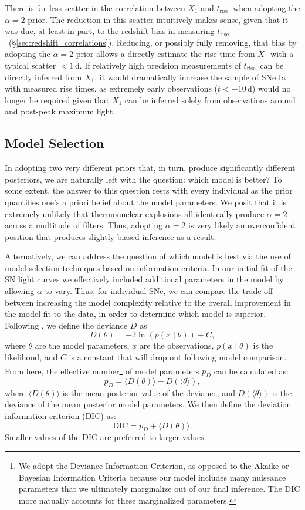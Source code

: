 \documentclass[twocolumn]{./aastex63}
\newcommand{\trise}{$t_\mathrm{rise}$}
\begin{document}
There is far less scatter in the correlation between $X_1$ and \trise\ when
adopting the $\alpha = 2$ prior. The reduction in this scatter intuitively
makes sense, given that it was due, at least in part, to the redshift bias in
measuring \trise\ (\S\ref{sec:redshift_correlations}). Reducing, or possibly
fully removing, that bias by adopting the $\alpha = 2$ prior allows a directly
estimate the rise time from $X_1$ with a typical scatter $< 1$\,d. If
relatively high precision measurements of \trise\ can be directly inferred
from $X_1$, it would dramatically increase the sample of SNe Ia with measured
rise times, as extremely early observations ($t < -10$\,d) would no longer be
required given that $X_1$ can be inferred solely from observations around and
post-peak maximum light.

\subsection{Model Selection}\label{sec:dic}

In adopting two very different priors that, in turn, produce significantly
different posteriors, we are naturally left with the question: which model is
better? To some extent, the answer to this question rests with every individual
as the prior quantifies one's a priori belief about the model parameters. We
posit that it is extremely unlikely that thermonuclear explosions all
identically produce $\alpha = 2$ across a multitude of filters. Thus, adopting
$\alpha = 2$ is very likely an overconfident position that produces slightly
biased inference as a result.

Alternatively, we can address the question of which model is best via the use
of model selection techniques based on information criteria. In our initial
fit of the SN light curves we effectively included additional parameters in
the model by allowing $\alpha$ to vary. Thus, for individual SNe, we can
compare the trade off between increasing the model complexity relative to the
overall improvement in the model fit to the data, in order to determine which
model is superior. Following \citet{Spiegelhalter02}, we define the deviance
$D$ as
%
$$D(\theta) = -2 \ln (p(x\mid \theta)) + C,$$
%
where $\theta$ are the model parameters, $x$ are the observations, $p(x\mid
\theta)$ is the likelihood, and $C$ is a constant that will drop out following
model comparison. From here, the effective number\footnote{We adopt the
Deviance Information Criterion, as opposed to the Akaike or Bayesian
Information Criteria because our model includes many nuissance parameters that
we ultimately marginalize out of our final inference. The DIC more natually
accounts for these marginalized parameters.} of model parameters $p_D$ can be
calculated as:
%
$$p_D = \langle D(\theta) \rangle - D(\langle \theta \rangle),$$
%
where $\langle D(\theta) \rangle$ is the mean posterior value of the deviance,
and $D(\langle \theta \rangle)$ is the deviance of the mean posterior model
parameters. We then define the deviation information criterion (DIC) as:
%
$$\mathrm{DIC} = p_D + \langle D(\theta) \rangle.$$
Smaller values of  the DIC are  preferred to larger values.
\end{document}

